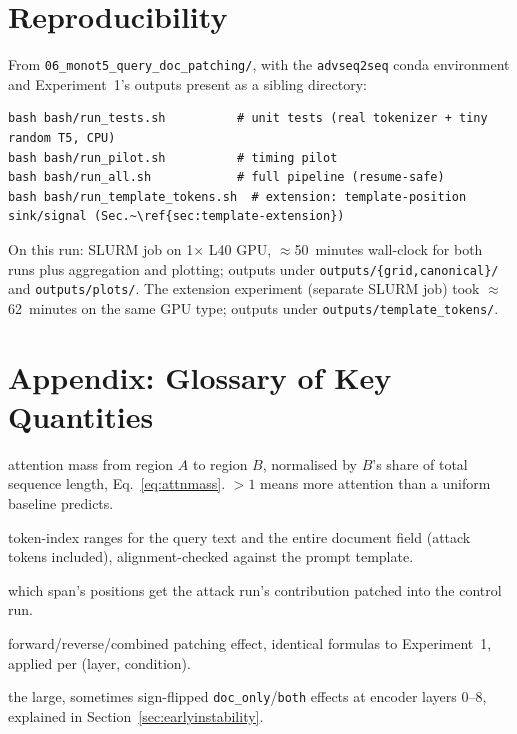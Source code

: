 \documentclass[11pt]{article}
\newcommand{\fwd}{\ensuremath{e^{\mathrm{fwd}}}}
\newcommand{\rev}{\ensuremath{e^{\mathrm{rev}}}}
\newcommand{\comb}{\ensuremath{e^{\mathrm{comb}}}}
\begin{document}
\section{Reproducibility}

From \texttt{06\_monot5\_query\_doc\_patching/}, with the
\texttt{advseq2seq} conda environment and Experiment~1's outputs present
as a sibling directory:

\begin{lstlisting}
bash bash/run_tests.sh          # unit tests (real tokenizer + tiny random T5, CPU)
bash bash/run_pilot.sh          # timing pilot
bash bash/run_all.sh            # full pipeline (resume-safe)
bash bash/run_template_tokens.sh  # extension: template-position sink/signal (Sec.~\ref{sec:template-extension})
\end{lstlisting}

\noindent On this run: SLURM job on 1$\times$ L40 GPU, $\approx$50~minutes
wall-clock for both runs plus aggregation and plotting; outputs under
\texttt{outputs/\{grid,canonical\}/} and \texttt{outputs/plots/}. The
extension experiment (separate SLURM job) took $\approx$62~minutes on the
same GPU type; outputs under \texttt{outputs/template\_tokens/}.

\section*{Appendix: Glossary of Key Quantities}

\begin{description}[leftmargin=1.6em,style=nextline]
  \item[normalized\_mass$(A\to B)$] attention mass from region $A$ to
  region $B$, normalised by $B$'s share of total sequence length,
  Eq.~\eqref{eq:attnmass}. $>1$ means more attention than a uniform
  baseline predicts.
  \item[query span / document span] token-index ranges for the query text
  and the entire document field (attack tokens included), alignment-checked
  against the prompt template.
  \item[doc\_only / query\_only / both] which span's positions get the
  attack run's contribution patched into the control run.
  \item[$\fwd$ / $\rev$ / $\comb$] forward/reverse/combined patching
  effect, identical formulas to Experiment~1, applied per (layer,
  condition).
  \item[early-layer instability] the large, sometimes sign-flipped
  \texttt{doc\_only}/\texttt{both} effects at encoder layers 0--8,
  explained in Section~\ref{sec:earlyinstability}.
\end{description}
\end{document}
